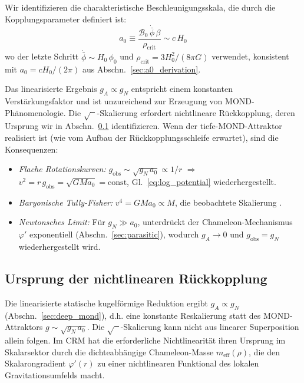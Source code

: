 \documentclass[aps,prd,twocolumn,superscriptaddress,nofootinbib]{revtex4-2}
\begin{document}
Wir identifizieren die charakteristische Beschleunigungsskala, die durch die Kopplungsparameter definiert ist:
\begin{equation}
a_0 \equiv \frac{\mathcal{B}_0\,\dot{\bar{\phi}}\,\beta}{\rho_{\mathrm{crit}}} \sim c\,H_0
\label{eq:a0_from_eom}
\end{equation}
wo der letzte Schritt $\dot{\bar{\phi}} \sim H_0\,\phi_0$ und $\rho_{\mathrm{crit}} = 3H_0^2/(8\pi G)$ verwendet, konsistent mit $a_0 = cH_0/(2\pi)$ aus Abschn.~\ref{sec:a0_derivation}.

Das linearisierte Ergebnis $g_A \propto g_N$ entspricht einem konstanten Verst\"arkungsfaktor und ist unzureichend zur Erzeugung von MOND-Ph\"anomenologie. Die $\sqrt{\phantom{x}}$-Skalierung erfordert nichtlineare R\"uckkopplung, deren Ursprung wir in Abschn.~\ref{sec:nonlinear_origin} identifizieren. Wenn der tiefe-MOND-Attraktor realisiert ist (wie vom Aufbau der R\"uckkopplungsschleife erwartet), sind die Konsequenzen:
\begin{itemize}
\item \textit{Flache Rotationskurven:} $g_{\mathrm{obs}} \sim \sqrt{g_N\,a_0} \propto 1/r$ $\Rightarrow$ $v^2 = r\,g_{\mathrm{obs}} = \sqrt{GMa_0} = \mathrm{const}$, Gl.~\eqref{eq:log_potential} wiederhergestellt.
\item \textit{Baryonische Tully-Fisher:} $v^4 = GMa_0 \propto M$, die beobachtete Skalierung \cite{McGaugh2012}.
\item \textit{Newtonsches Limit:} F\"ur $g_N \gg a_0$, unterdr\"uckt der Chameleon-Mechanismus $\varphi'$ exponentiell (Abschn.~\ref{sec:parasitic}), wodurch $g_A \to 0$ und $g_{\mathrm{obs}} = g_N$ wiederhergestellt wird.
\end{itemize}

\subsection{Ursprung der nichtlinearen R\"uckkopplung}
\label{sec:nonlinear_origin}

Die linearisierte statische kugelf\"ormige Reduktion ergibt $g_A \propto g_N$ (Abschn.~\ref{sec:deep_mond}), d.h. eine konstante Reskalierung statt des MOND-Attraktors $g \sim \sqrt{g_N\,a_0}$. Die $\sqrt{\phantom{x}}$-Skalierung kann nicht aus linearer Superposition allein folgen. Im CRM hat die erforderliche Nichtlinearit\"at ihren Ursprung im Skalarsektor durch die dichteabh\"angige Chameleon-Masse $m_{\mathrm{eff}}(\rho)$, die den Skalarongradient $\varphi'(r)$ zu einer nichtlinearen Funktional des lokalen Gravitationsumfelds macht.
\end{document}
